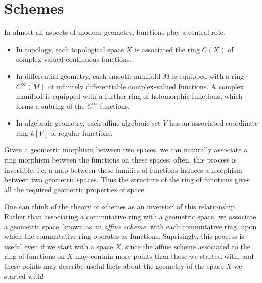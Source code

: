 \chapter{Schemes}

In almost all aspects of modern geometry, functions play a central role.
%
\begin{itemize}
    \item In topology, each topological space $X$ is associated the ring $C(X)$ of complex-valued continuous functions.
    \item In differential geometry, each smooth manifold $M$ is equipped with a ring $C^\infty(M)$ of infinitely differentiable complex-valued functions. A complex manifold is equipped with a further ring of holomorphic functions, which forms a subring of the $C^\infty$ functions.
    \item In algebraic geometry, each affine algebraic set $V$ has an associated coordinate ring $k[V]$ of regular functions.
\end{itemize}
%
Given a geometric morphism between two spaces, we can naturally associate a ring morphism between the functions on these spaces; often, this process is invertible, i.e. a map between these families of functions induces a morphism between two geometric spaces. Thus the structure of the ring of functions gives all the required geometric properties of space.

One can think of the theory of schemes as an inversion of this relationship. Rather than associating a commutative ring with a geometric space, we associate a geometric space, known as an {\it affine scheme}, with each commutative ring, upon which the commutative ring operates as functions. Suprisingly, this process is useful even if we start with a space $X$, since the affine scheme associated to the ring of functions on $X$ may contain more points than those we started with, and these points may describe useful facts about the geometry of the space $X$ we started with!

